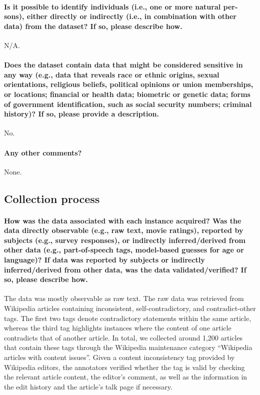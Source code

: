 \documentclass{article}
\begin{document}
\paragraph{Is it possible to identify individuals (i.e., one or more natural per- sons), either directly or indirectly (i.e., in combination with other data) from the dataset? If so, please describe how.}
N/A.


\paragraph{Does the dataset contain data that might be considered sensitive in any way (e.g., data that reveals race or ethnic origins, sexual orientations, religious beliefs, political opinions or union memberships, or locations; financial or health data; biometric or genetic data; forms of government identification, such as social security numbers; criminal history)? If so, please provide a description.}
No.

\paragraph{Any other comments?}
None.

\subsection{Collection process}
\paragraph{How was the data associated with each instance acquired? Was the data directly observable (e.g., raw text, movie ratings), reported by subjects (e.g., survey responses), or indirectly inferred/derived from other data (e.g., part-of-speech tags, model-based guesses for age or language)? If data was reported by subjects or indirectly inferred/derived from other data, was the data validated/verified? If so, please describe how.}
The data was mostly observable as raw text. The raw data was retrieved from Wikipedia articles containing inconsistent, self-contradictory, and contradict-other tags. The first two tags denote contradictory statements within the same article, whereas the third tag highlights instances where the content of one article contradicts that of another article. In total, we collected around 1,200 articles that contain these tags through the Wikipedia maintenance category ``Wikipedia articles with content issues''. Given a content inconsistency tag provided by Wikipedia editors, the annotators verified whether the tag is valid by checking the relevant article content, the editor’s comment, as well as the information in the edit history and the article’s talk page if necessary.
\end{document}
